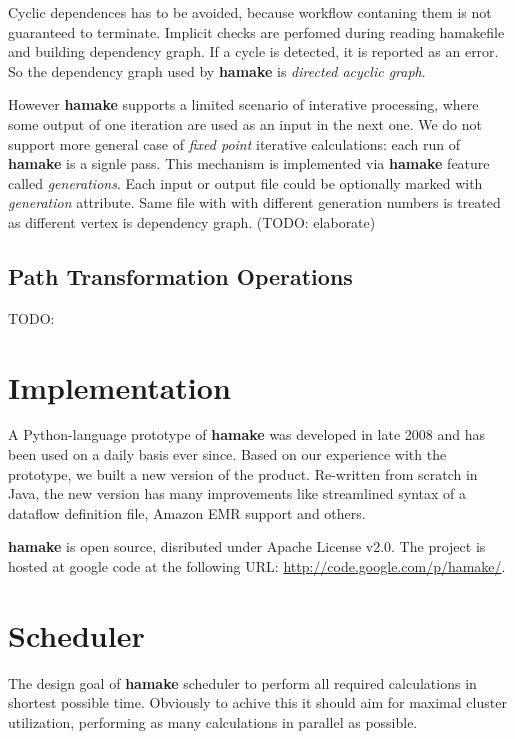 \documentclass{article}
\begin{document}
Cyclic dependences has to be avoided, because workflow contaning them
is not guaranteed to terminate. Implicit checks are perfomed during
reading hamakefile and building dependency graph. If a cycle is
detected, it is reported as an error. So the dependency graph used by
\textbf{hamake} is \textit{directed acyclic graph}.

However \textbf{hamake} supports a limited scenario of interative processing,
where some output of one iteration are used as an input in the next
one. We do not support more general case of \textit{fixed point}
iterative calculations: each run of \textbf{hamake} is a signle pass. This
mechanism is implemented via \textbf{hamake} feature called
\textit{generations}. Each input or output file could be optionally
marked with \emph{generation} attribute. Same file with with different
generation numbers is treated as different vertex is dependency
graph. (TODO: elaborate)

\subsection{Path Transformation Operations}

TODO:

\section{Implementation}

A Python-language prototype of \textbf{hamake} was developed in late
2008 and has been used on a daily basis ever since. Based on our
experience with the prototype, we built a new version of the
product. Re-written from scratch in Java, the new version has many
improvements like streamlined syntax of a dataflow definition file,
Amazon EMR support and others.

\textbf{hamake} is open source, disributed under Apache License v2.0. The
project is hosted at google code at the following URL:
\url{http://code.google.com/p/hamake/}.

\section{Scheduler}

The design goal of \textbf{hamake} scheduler to perform all required
calculations in shortest possible time. Obviously to achive this it
should aim for maximal cluster utilization, performing as many
calculations in parallel as possible.
\end{document}
